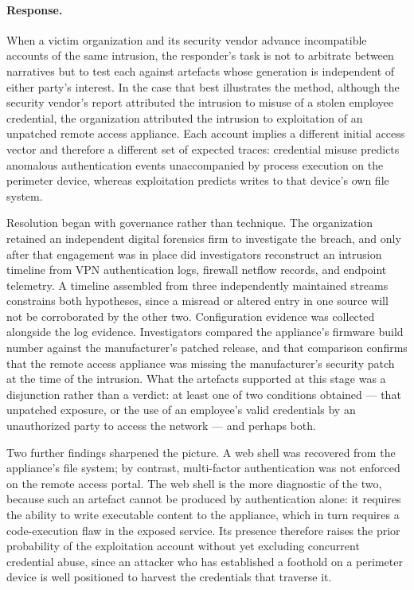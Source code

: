 \documentclass[11pt]{article}
\begin{document}
\paragraph{Response.} {\small When a victim organization and its security vendor advance incompatible accounts of the same
intrusion, the responder's task is not to arbitrate between narratives but to test each against
artefacts whose generation is independent of either party's interest. In the case that best
illustrates the method, although the security vendor's report attributed the intrusion to misuse of
a stolen employee credential, the organization attributed the intrusion to exploitation of an
unpatched remote access appliance. Each account implies a different initial access vector and
therefore a different set of expected traces: credential misuse predicts anomalous authentication
events unaccompanied by process execution on the perimeter device, whereas exploitation predicts
writes to that device's own file system.

Resolution began with governance rather than technique. The organization retained an independent
digital forensics firm to investigate the breach, and only after that engagement was in place did
investigators reconstruct an intrusion timeline from VPN authentication logs, firewall netflow
records, and endpoint telemetry. A timeline assembled from three independently maintained streams
constrains both hypotheses, since a misread or altered entry in one source will not be corroborated
by the other two. Configuration evidence was collected alongside the log evidence. Investigators
compared the appliance's firmware build number against the manufacturer's patched release, and that
comparison confirms that the remote access appliance was missing the manufacturer's security patch
at the time of the intrusion. What the artefacts supported at this stage was a disjunction rather
than a verdict: at least one of two conditions obtained — that unpatched exposure, or the use of an
employee's valid credentials by an unauthorized party to access the network — and perhaps both.

Two further findings sharpened the picture. A web shell was recovered from the appliance's file
system; by contrast, multi-factor authentication was not enforced on the remote access portal. The
web shell is the more diagnostic of the two, because such an artefact cannot be produced by
authentication alone: it requires the ability to write executable content to the appliance, which
in turn requires a code-execution flaw in the exposed service. Its presence therefore raises the
prior probability of the exploitation account without yet excluding concurrent credential abuse,
since an attacker who has established a foothold on a perimeter device is well positioned to harvest
the credentials that traverse it.

}
\end{document}
